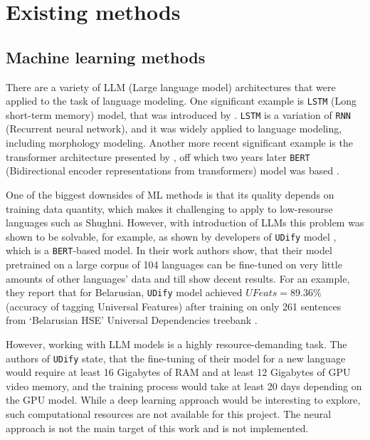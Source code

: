 \section{Existing methods}

\subsection{Machine learning methods} \label{dl_methods}
There are a variety of LLM (Large language model) architectures that were applied to the task of language modeling. One significant example is \texttt{LSTM} (Long short-term memory) model, that was introduced by \textcite{lstm_1997}. \texttt{LSTM} is a variation of \texttt{RNN} (Recurrent neural network), and it was widely applied to language modeling, including morphology modeling. Another more recent significant example is the transformer architecture presented by \textcite{transformer_2017}, off which two years later \texttt{BERT} (Bidirectional encoder representations from transformers) model was based \parencite{devlin_2019}. 

One of the biggest downsides of ML methods is that its quality depends on training data quantity, which makes it challenging to apply to low-resourse languages such as Shughni. However, with introduction of LLMs this problem was shown to be solvable, for example, as shown by developers of \texttt{UDify} model \parencite{kondratyuk_straka_model_2019}, which is a \texttt{BERT}-based model. In their work authors show, that their model pretrained on a large corpus of 104 languages can be fine-tuned on very little amounts of other languages' data and till show decent results. For an example, they report that for Belarusian, \texttt{UDify} model achieved $UFeats=89.36\%$ (accuracy of tagging Universal Features) after training on only 261 sentences from `Belarusian HSE' Universal Dependencies treebank \parencite[Table 7]{kondratyuk_straka_model_2019}.

However, working with LLM models is a highly resource-demanding task. The authors of \texttt{UDify} state, that the fine-tuning of their model for a new language would require at least 16 Gigabytes of RAM and at least 12 Gigabytes of GPU video memory, and the training process would take at least 20 days depending on the GPU model. While a deep learning approach would be interesting to explore, such computational resources are not available for this project. The neural approach is not the main target of this work and is not implemented. 

